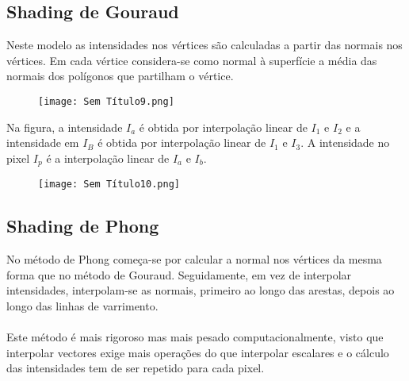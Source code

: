 \documentclass[10pt,a4paper]{report}
\begin{document}
\subsection{Shading de Gouraud}
Neste modelo as intensidades nos vértices são calculadas a partir das normais nos vértices. Em cada vértice considera-se como normal à superfície a média das normais dos polígonos que partilham o vértice.
\begin{figure}[H]
\centering
\texttt{[image: Sem Título9.png]}
\end{figure}
Na figura, a intensidade $I_a$ é obtida por interpolação linear de $I_1$ e $I_2$ e a intensidade em $I_B$ é obtida por interpolação linear de $I_1$ e $I_3$. A intensidade no pixel $I_p$ é a interpolação linear de $I_a$ e $I_b$.
\begin{figure}[H]
\centering
\texttt{[image: Sem Título10.png]}
\end{figure}
\subsection{Shading de Phong}
No método de Phong começa-se por calcular a normal nos vértices da mesma forma que no método de Gouraud. Seguidamente, em vez de interpolar intensidades, interpolam-se as normais, primeiro ao longo das arestas, depois ao longo das linhas de varrimento.\\
\\
Este método é mais rigoroso mas mais pesado computacionalmente, visto que interpolar vectores exige mais operações do que interpolar escalares e o cálculo das intensidades tem de ser repetido para cada pixel.
\end{document}

